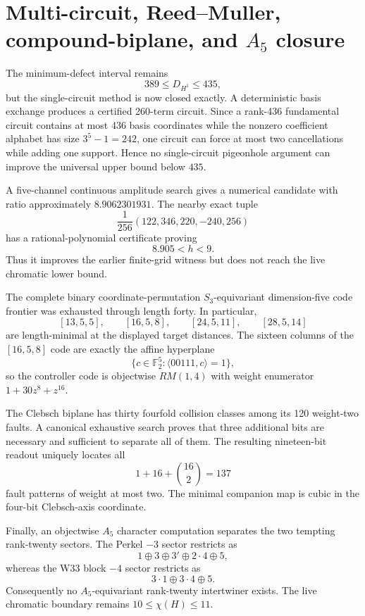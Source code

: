 \section{Multi-circuit, Reed--Muller, compound-biplane, and $A_5$ closure}
\label{sec:bt3514-3527}

The minimum-defect interval remains
\[
389\le D_{H^1}\le435,
\]
but the single-circuit method is now closed exactly.  A deterministic basis
exchange produces a certified 260-term circuit.  Since a rank-436 fundamental
circuit contains at most 436 basis coordinates while the nonzero coefficient
alphabet has size $3^5-1=242$, one circuit can force at most two
cancellations while adding one support.  Hence no single-circuit pigeonhole
argument can improve the universal upper bound below $435$.

A five-channel continuous amplitude search gives a numerical candidate with
ratio approximately $8.9062301931$.  The nearby exact tuple
\[
\frac1{256}(122,346,220,-240,256)
\]
has a rational-polynomial certificate proving
\[
8.905<h<9.
\]
Thus it improves the earlier finite-grid witness but does not reach the live
chromatic lower bound.

The complete binary coordinate-permutation $S_3$-equivariant dimension-five
code frontier was exhausted through length forty.  In particular,
\[
[13,5,5],\qquad [16,5,8],\qquad[24,5,11],\qquad[28,5,14]
\]
are length-minimal at the displayed target distances.  The sixteen columns of
the $[16,5,8]$ code are exactly the affine hyperplane
\[
\{c\in\mathbb F_2^5:\langle00111,c\rangle=1\},
\]
so the controller code is objectwise $RM(1,4)$ with weight enumerator
$1+30z^8+z^{16}$.

The Clebsch biplane has thirty fourfold collision classes among its 120
weight-two faults.  A canonical exhaustive search proves that three additional
bits are necessary and sufficient to separate all of them.  The resulting
nineteen-bit readout uniquely locates all
\[
1+16+\binom{16}{2}=137
\]
fault patterns of weight at most two.  The minimal companion map is cubic in
the four-bit Clebsch-axis coordinate.

Finally, an objectwise $A_5$ character computation separates the two tempting
rank-twenty sectors.  The Perkel $-3$ sector restricts as
\[
1\oplus3\oplus3'\oplus2\cdot4\oplus5,
\]
whereas the W33 block $-4$ sector restricts as
\[
3\cdot1\oplus3\cdot4\oplus5.
\]
Consequently no $A_5$-equivariant rank-twenty intertwiner exists.  The live
chromatic boundary remains $10\le\chi(H)\le11$.
